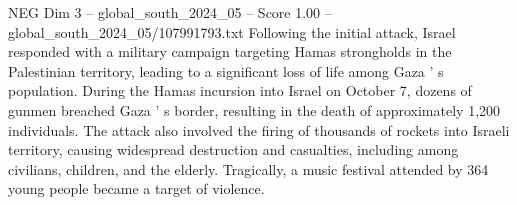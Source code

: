\begin{textsample}{NEG Dim 3 – global\_south\_2024\_05 – Score 1.00 – global\_south\_2024\_05/107991793.txt}
Following the initial attack, Israel responded with a military campaign targeting Hamas strongholds in the Palestinian territory, leading to a significant loss of life among Gaza ' s population.
During the Hamas incursion into Israel on October 7, dozens of gunmen breached Gaza ' s border, resulting in the death of approximately 1,200 individuals.
The attack also involved the firing of thousands of rockets into Israeli territory, causing widespread destruction and casualties, including among civilians, children, and the elderly.
Tragically, a music festival attended by 364 young people became a target of violence.

\end{textsample}
